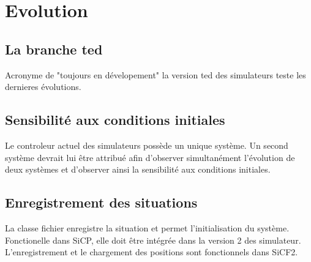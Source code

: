 %
\section{Evolution}
%
%
\subsection{La branche ted}
Acronyme de "toujours en dévelopement" la version ted des simulateurs teste les dernieres évolutions.
%
\subsection{Sensibilité aux conditions initiales}
Le controleur actuel des simulateurs possède un unique système. Un second système devrait lui être attribué afin d'observer simultanément l'évolution de deux systèmes et d'observer ainsi la sensibilité aux conditions initiales.
%
\subsection{Enregistrement des situations}
La classe fichier enregistre la situation et permet l'initialisation du système. Fonctionelle dans SiCP, elle doit être intégrée dans la version 2 des simulateur.
L'enregistrement et le chargement des positions sont fonctionnels dans SiCF2.
%
%
%
